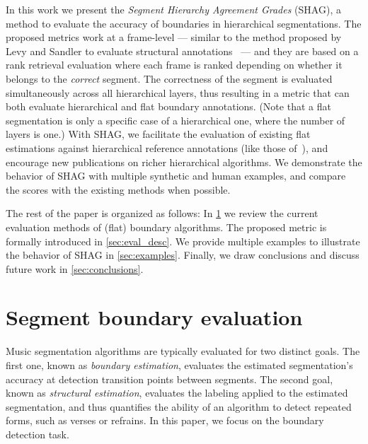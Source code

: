\documentclass{article}
\begin{document}

In this work we present the \emph{Segment Hierarchy Agreement Grades} (SHAG), a method to evaluate the accuracy of boundaries in hierarchical segmentations.
The proposed metrics work at a frame-level --- similar to the method proposed by Levy and Sandler to evaluate structural annotations~\cite{Levy2008} --- and they are based on a rank retrieval evaluation where each frame is ranked depending on whether it belongs to the \emph{correct} segment.
The correctness of the segment is evaluated simultaneously across all hierarchical layers, thus resulting in a metric that can both evaluate hierarchical and flat boundary annotations. 
(Note that a flat segmentation is only a specific case of a hierarchical one, where the number of layers is one.)
With SHAG, we facilitate the evaluation of existing flat estimations against hierarchical reference annotations (like those of~\cite{Smith2011}), and encourage new publications on richer hierarchical algorithms.
We demonstrate the behavior of SHAG with multiple synthetic and human examples, and compare the scores with the existing methods when possible.


The rest of the paper is organized as follows: In \cref{sec:curr_meth} we review the current evaluation methods of (flat) boundary algorithms. 
The proposed metric is formally introduced in \cref{sec:eval_desc}. 
We provide multiple examples to illustrate the behavior of SHAG in \cref{sec:examples}.
Finally, we draw conclusions and discuss future work in \cref{sec:conclusions}.

\section{Segment boundary evaluation}\label{sec:curr_meth}

Music segmentation algorithms are typically evaluated for two distinct goals.  
The first one, known as \emph{boundary estimation}, evaluates the estimated segmentation's accuracy at detection transition points between segments.
The second goal, known as \emph{structural estimation}, evaluates the labeling applied to the estimated segmentation, and thus quantifies the ability of an algorithm to detect repeated
forms, such as verses or refrains.  In this paper, we focus on the boundary detection task.
\end{document}
